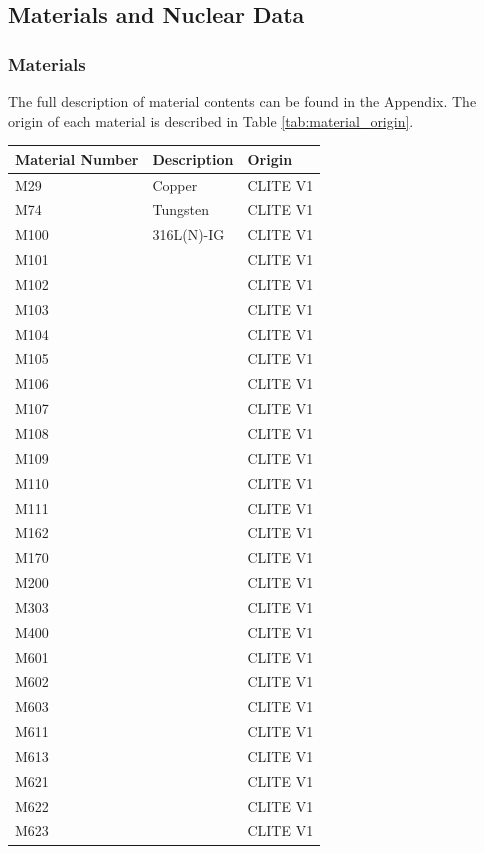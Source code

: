 \documentclass[12pt]{article}
\begin{document}
\subsection{Materials and Nuclear Data}
\subsubsection{Materials}
The full description of material contents can be found in the Appendix. The 
origin of each material is described in Table \ref{tab:material_origin}. 

\begin{centering}
 \begin{longtable}[ht!]{ p{} | p{} | p{} }
  \hline 
  Material Number & Description & Origin \\
  \hline
  M29  & Copper &  CLITE V1 \\
  M74  & Tungsten &  CLITE V1 \\
  M100  & 316L(N)-IG &  CLITE V1 \\
  M101  & &  CLITE V1 \\
  M102  & &  CLITE V1 \\
  M103  & &  CLITE V1 \\
  M104  & &  CLITE V1 \\
  M105  & &  CLITE V1 \\
  M106  & &  CLITE V1 \\
  M107  & &  CLITE V1 \\
  M108  & &  CLITE V1 \\
  M109  & &  CLITE V1 \\
  M110  & &  CLITE V1 \\
  M111  & &  CLITE V1 \\
  M162  & &  CLITE V1 \\
  M170  & &  CLITE V1 \\
  M200  & &  CLITE V1 \\
  M303  & &  CLITE V1 \\
  M400  & &  CLITE V1 \\
  M601  & &  CLITE V1 \\
  M602  & &  CLITE V1 \\
  M603  & &  CLITE V1 \\
  M611  & &  CLITE V1 \\
  M613  & &  CLITE V1 \\
  M621  & &  CLITE V1 \\
  M622  & &  CLITE V1 \\
  M623  & &  CLITE V1 \\

\end{longtable}
\end{centering}
\end{document}
